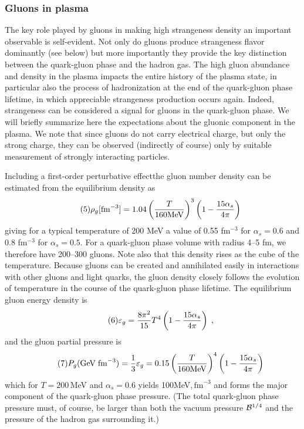 \begin{mdframed}[linecolor=gray,roundcorner=12pt,backgroundcolor=Dandelion!15,linewidth=1pt,leftmargin=0cm,rightmargin=0cm,topline=true,bottomline=true,skipabove=12pt]
\subsubsection*{\bf Gluons in plasma}
The key role played by gluons in making high strangeness density an important observable is self-evident. Not only do gluons produce strangeness flavor dominantly (see below) but more importantly they provide the key distinction between the quark-gluon phase and the hadron gas. The high gluon abundance and density in the plasma impacts the entire history of the plasma state, in particular also the process of hadronization at the end of the quark-gluon phase lifetime, in which appreciable strangeness production occurs again. Indeed, strangeness can be considered a signal for gluons in the quark-gluon phase. We will briefly summarize here the expectations about the gluonic component in the plasma. We note that since gluons do not carry electrical charge, but only the strong charge, they can be observed (indirectly of course) only by suitable measurement of strongly interacting particles.  

Including a first-order perturbative effect\footnotemark[17] the gluon number density can be estimated from the equilibrium density as 
\begin{equation} \tag{5}
\rho_g [\mbox{fm}^{-3}] = 1.04 \left( {T\over 160\mbox{MeV} } \right)^{3} \left( 1- {15\alpha_s\over 4\pi} \right) 
\end{equation} 
giving for a typical temperature of 200 MeV a value of 0.55 fm$^{-3}$ for $\alpha_s = 0.6$ and 0.8 fm$^{-3}$ for $\alpha_s = 0.5$. For a quark-gluon phase volume with radius 4--5 fm, we therefore have 200--300 gluons. Note also that this density rises as the cube of the temperature. Because gluons can be created and annihilated easily in interactions with other gluons and light quarks, the gluon density closely follows the evolution of temperature in the course of the quark-gluon phase lifetime. The equilibrium gluon energy density is 
\begin{equation}\label{fg} \tag{6}
\varepsilon_g = {8\pi^2\over 15} T^4 \left( 1 - {15\alpha_s\over 4\pi} \right) \;,
\end{equation} 
and the gluon partial pressure is 
\begin{equation}\label{fh} \tag{7}
P_g (\mathrm{ GeV\; fm}^{-3} )  
 = {{1\over 3}} \varepsilon_g 
 =  0.15 \left( {T\over 160 \mathrm{MeV}} \right)^{4} \left( 1 - {15\alpha_s\over 4\pi} \right) 
\end{equation} 
which for $T = 200$\,MeV and $\alpha_s = 0.6$ yields 100MeV,$\,\mbox{fm}^{-3}$  and forms the major component of the quark-gluon phase pressure. (The total quark-gluon phase pressure must, of course, be larger than both the vacuum pressure ${\cal B}^{1/4}$ and the pressure of the hadron gas surrounding it.) 


\end{mdframed}

